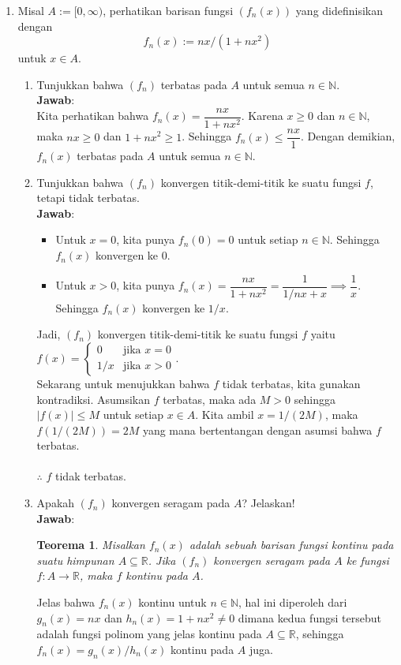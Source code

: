 \documentclass[12pt,openany,a4paper]{article}
\newtheorem*{teorema}{Teorema}
\newcommand{\R}{\mathbb{R}}
\newcommand{\N}{\mathbb{N}}
\newcommand{\jawab}{\textbf{Jawab}:}
\begin{document}
\begin{enumerate}
    \item Misal $A:=[0,\infty)$, perhatikan barisan fungsi $(f_n(x))$ yang didefinisikan dengan
    \[f_n(x):=nx/(1+nx^2)\]
    untuk $x\in A$.
    \begin{enumerate}
        \item Tunjukkan bahwa $(f_n)$ terbatas pada $A$ untuk semua $n\in\N$.\\
            \jawab\\
            Kita perhatikan bahwa $f_n(x)=\dfrac{nx}{1+nx^2}$. Karena $x\geq 0$ dan $n\in\N$, 
            maka $nx\geq 0$ dan $1+nx^2\geq 1$. Sehingga $f_n(x)\leq \dfrac{nx}{1}$. Dengan 
            demikian, $f_n(x)$ terbatas pada $A$ untuk semua $n\in\N$.
            
            \item Tunjukkan bahwa $(f_n)$ konvergen titik-demi-titik ke suatu fungsi $f$, tetapi tidak terbatas.\\
            \jawab
            \begin{itemize}
                \item Untuk $x=0$, kita punya $f_n(0)=0$ untuk setiap $n\in\N$. Sehingga $f_n(x)$ konvergen ke $0$.
                \item Untuk $x>0$, kita punya $f_n(x)=\dfrac{nx}{1+nx^2}=\dfrac{1}{1/nx+x}\implies\dfrac{1}{x}$. 
                Sehingga $f_n(x)$ konvergen ke $1/x$.
            \end{itemize}
            Jadi, $(f_n)$ konvergen titik-demi-titik ke suatu fungsi $f$ yaitu $f(x)=\begin{cases}0&\text{jika }x=0\\1/x&\text{jika }x>0\end{cases}$.\\
            Sekarang untuk menujukkan bahwa $f$ tidak terbatas, kita gunakan kontradiksi. 
            Asumsikan $f$ terbatas, maka ada $M>0$ sehingga $|f(x)|\leq M$ untuk setiap $x\in A$. 
            Kita ambil $x=1/(2M)$, maka $f(1/(2M))=2M$ yang mana bertentangan dengan asumsi bahwa $f$ terbatas.\\\\
            $\therefore$ $f$ tidak terbatas.\\

            \item Apakah $(f_n)$ konvergen seragam pada $A$? Jelaskan!\\
            \jawab
            \begin{teorema}
                Misalkan $f_n(x)$ adalah sebuah barisan fungsi kontinu pada suatu himpunan 
                $A \subseteq \R$. Jika $(f_n)$ konvergen seragam pada $A$ ke fungsi $f : A \to \R$, 
                maka $f$ kontinu pada $A$.
            \end{teorema}
            Jelas bahwa $f_n(x)$ kontinu untuk $n\in\N$, hal ini diperoleh dari $g_n(x)=nx$ dan 
            $h_n(x)=1+nx^2\ne 0$ dimana kedua fungsi tersebut adalah fungsi polinom yang jelas kontinu pada $A\subseteq \R$, sehingga 
            $f_n(x)=g_n(x)/h_n(x)$ kontinu pada $A$ juga.
            

\end{enumerate}
\end{enumerate}
\end{document}
